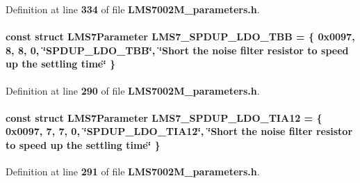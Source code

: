 Definition at line {\bf 334} of file {\bf L\+M\+S7002\+M\+\_\+parameters.\+h}.

\paragraph[{L\+M\+S7\+\_\+\+S\+P\+D\+U\+P\+\_\+\+L\+D\+O\+\_\+\+T\+BB}]{\setlength{\rightskip}{0pt plus 5cm}const struct {\bf L\+M\+S7\+Parameter} L\+M\+S7\+\_\+\+S\+P\+D\+U\+P\+\_\+\+L\+D\+O\+\_\+\+T\+BB = \{ 0x0097, 8, 8, 0, \char`\"{}\+S\+P\+D\+U\+P\+\_\+\+L\+D\+O\+\_\+\+T\+B\+B\char`\"{}, \char`\"{}\+Short the noise filter resistor to speed up the settling time\char`\"{} \}\hspace{0.3cm}{\ttfamily [static]}}\label{LMS7002M__parameters_8h_ae2457473783cf33f3b797d327584ab78}


Definition at line {\bf 290} of file {\bf L\+M\+S7002\+M\+\_\+parameters.\+h}.

\paragraph[{L\+M\+S7\+\_\+\+S\+P\+D\+U\+P\+\_\+\+L\+D\+O\+\_\+\+T\+I\+A12}]{\setlength{\rightskip}{0pt plus 5cm}const struct {\bf L\+M\+S7\+Parameter} L\+M\+S7\+\_\+\+S\+P\+D\+U\+P\+\_\+\+L\+D\+O\+\_\+\+T\+I\+A12 = \{ 0x0097, 7, 7, 0, \char`\"{}\+S\+P\+D\+U\+P\+\_\+\+L\+D\+O\+\_\+\+T\+I\+A12\char`\"{}, \char`\"{}\+Short the noise filter resistor to speed up the settling time\char`\"{} \}\hspace{0.3cm}{\ttfamily [static]}}\label{LMS7002M__parameters_8h_a1c60c2122129b2499637c0d22ba64b71}


Definition at line {\bf 291} of file {\bf L\+M\+S7002\+M\+\_\+parameters.\+h}.

